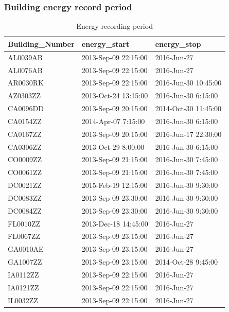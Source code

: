 \documentclass[12pt]{article}
\begin{document}
\subsubsection{Building energy record period}
\begin{longtable}{lll}
\caption{Energy recording period}\\
\label{tab:wretro}
Building\_Number & energy\_start        & energy\_stop         \\ \hline \hline \endhead
AL0039AB         & 2013-Sep-09 22:15:00 & 2016-Jun-27          \\
AL0076AB         & 2013-Sep-09 22:15:00 & 2016-Jun-27          \\
AR0030RK         & 2013-Sep-09 22:15:00 & 2016-Jun-30 10:45:00 \\
AZ0303ZZ         & 2013-Oct-24 13:15:00 & 2016-Jun-30 6:15:00  \\
CA0096DD         & 2013-Sep-09 20:15:00 & 2014-Oct-30 11:45:00 \\
CA0154ZZ         & 2014-Apr-07 7:15:00  & 2016-Jun-30 6:15:00  \\
CA0167ZZ         & 2013-Sep-09 20:15:00 & 2016-Jun-17 22:30:00 \\
CA0306ZZ         & 2013-Oct-29 8:00:00  & 2016-Jun-30 6:15:00  \\
CO0009ZZ         & 2013-Sep-09 21:15:00 & 2016-Jun-30 7:45:00  \\
CO0061ZZ         & 2013-Sep-09 21:15:00 & 2016-Jun-30 7:45:00  \\
DC0021ZZ         & 2015-Feb-19 12:15:00 & 2016-Jun-30 9:30:00  \\
DC0083ZZ         & 2013-Sep-09 23:30:00 & 2016-Jun-30 9:30:00  \\
DC0084ZZ         & 2013-Sep-09 23:30:00 & 2016-Jun-30 9:30:00  \\
FL0010ZZ         & 2013-Dec-18 14:45:00 & 2016-Jun-27          \\
FL0067ZZ         & 2013-Sep-09 23:15:00 & 2016-Jun-27          \\
GA0010AE         & 2013-Sep-09 23:15:00 & 2016-Jun-27          \\
GA1007ZZ         & 2013-Sep-09 23:15:00 & 2014-Oct-28 9:45:00  \\
IA0112ZZ         & 2013-Sep-09 22:15:00 & 2016-Jun-27          \\
IA0121ZZ         & 2013-Sep-09 22:15:00 & 2016-Jun-27          \\
IL0032ZZ         & 2013-Sep-09 22:15:00 & 2016-Jun-27          \\

\end{longtable}
\end{document}

